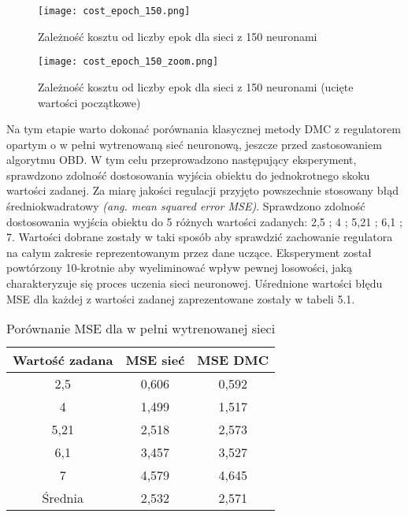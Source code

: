 \begin{figure}[h]
  \label{fig:Koszt-liczba-epok}
  \centering \texttt{[image: cost\_epoch\_150.png]}
  \caption{Zależność kosztu od liczby epok dla sieci z 150 neuronami}
\end{figure}

\begin{figure}[h]
  \label{fig:Koszt-liczba-epok-zoom}
  \centering \texttt{[image: cost\_epoch\_150\_zoom.png]}
  \caption{Zależność kosztu od liczby epok dla sieci z 150 neuronami (ucięte wartości początkowe)}
\end{figure}

\par Na tym etapie warto dokonać porównania klasycznej metody DMC z regulatorem opartym o w pełni wytrenowaną sieć neuronową, jeszcze przed zastosowaniem algorytmu OBD. W tym celu przeprowadzono następujący eksperyment, sprawdzono zdolność dostosowania wyjścia obiektu do jednokrotnego skoku wartości zadanej. Za miarę jakości regulacji przyjęto powszechnie stosowany błąd średniokwadratowy \emph{(ang. mean squared error MSE)}. Sprawdzono zdolność dostosowania wyjścia obiektu do 5 różnych wartości zadanych: 2,5 ; 4 ; 5,21 ; 6,1 ; 7. Wartości dobrane zostały w taki sposób aby sprawdzić zachowanie regulatora na całym zakresie reprezentowanym przez dane uczące. Eksperyment został powtórzony 10-krotnie aby wyeliminować wpływ pewnej losowości, jaką charakteryzuje się proces uczenia sieci neuronowej. Uśrednione wartości błędu MSE dla każdej z wartości zadanej zaprezentowane zostały w tabeli 5.1.
\begin{table}[!h] \label{tab:tabela1} \centering
\caption{Porównanie MSE dla w pełni wytrenowanej sieci}
\begin{tabular} {| c | c | c |} \hline
    Wartość zadana & MSE sieć & MSE DMC \\ \hline\hline
    2,5 & 0,606 & 0,592 \\ \hline
    4 & 1,499 & 1,517 \\ \hline
    5,21 & 2,518 & 2,573 \\ \hline
    6,1 & 3,457 & 3,527 \\ \hline
    7 & 4,579 & 4,645 \\ \hline
    Średnia & 2,532 & 2,571 \\ \hline
    
\end{tabular}
\end{table}
